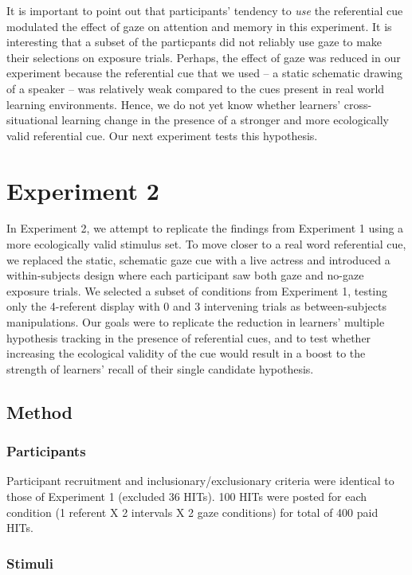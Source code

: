 \documentclass[a4paper,man,natbib]{apa6}
\begin{document}
It is important to point out that participants' tendency to \emph{use}
the referential cue modulated the effect of gaze on attention and memory
in this experiment. It is interesting that a subset of the particpants
did not reliably use gaze to make their selections on exposure trials.
Perhaps, the effect of gaze was reduced in our experiment because the
referential cue that we used -- a static schematic drawing of a speaker
-- was relatively weak compared to the cues present in real world
learning environments. Hence, we do not yet know whether learners'
cross-situational learning change in the presence of a stronger and more
ecologically valid referential cue. Our next experiment tests this
hypothesis.

\section{Experiment 2}\label{experiment-2}

In Experiment 2, we attempt to replicate the findings from Experiment 1
using a more ecologically valid stimulus set. To move closer to a real
word referential cue, we replaced the static, schematic gaze cue with a
live actress and introduced a within-subjects design where each
participant saw both gaze and no-gaze exposure trials. We selected a
subset of conditions from Experiment 1, testing only the 4-referent
display with 0 and 3 intervening trials as between-subjects
manipulations. Our goals were to replicate the reduction in learners'
multiple hypothesis tracking in the presence of referential cues, and to
test whether increasing the ecological validity of the cue would result
in a boost to the strength of learners' recall of their single candidate
hypothesis.

\subsection{Method}\label{method-1}

\subsubsection{Participants}\label{participants-1}

Participant recruitment and inclusionary/exclusionary criteria were
identical to those of Experiment 1 (excluded 36 HITs). 100 HITs were
posted for each condition (1 referent X 2 intervals X 2 gaze conditions)
for total of 400 paid HITs.

\subsubsection{Stimuli}\label{stimuli-1}
\end{document}
